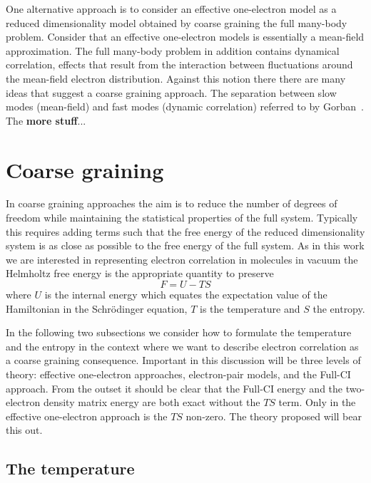 \documentclass[pra]{revtex4-1}
\begin{document}
One alternative approach is to consider an effective one-electron model as 
a reduced dimensionality model obtained by coarse graining the full many-body 
problem. Consider that an effective one-electron models is essentially a 
mean-field approximation. The full many-body problem in addition contains
dynamical correlation, effects that result from the interaction between 
fluctuations around the mean-field electron distribution. Against this notion
there there are many ideas that suggest a coarse graining approach. 
The separation between slow modes (mean-field) and fast modes (dynamic
correlation) referred to by Gorban~\cite{Gorban_2006}. The {\bf more stuff}...

\section{Coarse graining}

In coarse graining approaches the aim is to reduce the number of degrees of 
freedom while maintaining the statistical properties of the full system. 
Typically this requires adding terms such that the free energy of the 
reduced dimensionality system is as close as possible to the free energy
of the full system. As in this work we are interested in representing electron
correlation in molecules in vacuum the Helmholtz free energy is the appropriate
quantity to preserve~\cite{Warren_1996,Weinert_1992,Gillan_1989,Mermin_1965}
\begin{equation}
  F = U - TS
  \label{Eq:Helmholtz}
\end{equation}
where $U$ is the internal energy which equates the expectation value of the
Hamiltonian in the Schr{\"o}dinger equation, $T$ is the temperature and $S$ the
entropy. 

In the following two subsections we consider how to formulate the temperature
and the entropy in the context where we want to describe electron correlation
as a coarse graining consequence. Important in this discussion will be three
levels of theory: effective one-electron approaches, electron-pair
models, and the Full-CI approach. From the outset it should be clear that the
Full-CI energy and the two-electron density matrix energy are both exact
without the $TS$ term. Only in the effective one-electron approach is the 
$TS$ non-zero. The theory proposed will bear this out.

\subsection{The temperature}
\end{document}
